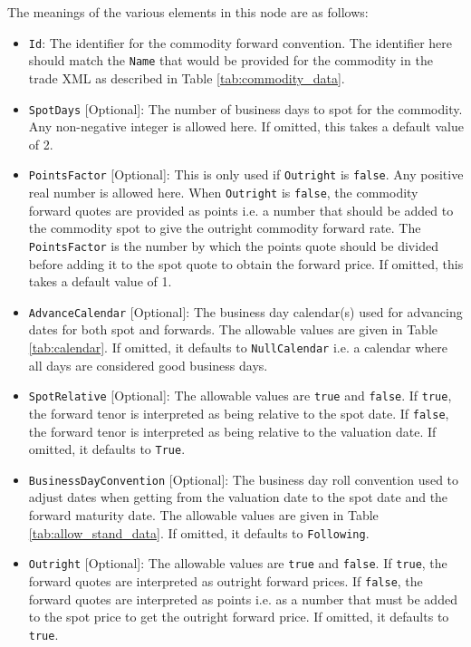 The meanings of the various elements in this node are as follows:
\begin{itemize}
\item \lstinline!Id!: The identifier for the commodity forward convention. The identifier here should match the \lstinline!Name! that would be provided for the commodity in the trade XML as described in Table \ref{tab:commodity_data}.
\item \lstinline!SpotDays! [Optional]: The number of business days to spot for the commodity. Any non-negative integer is allowed here. If omitted, this takes a default value of 2.
\item \lstinline!PointsFactor! [Optional]: This is only used if \lstinline!Outright! is \lstinline!false!. Any positive real number is allowed here. When \lstinline!Outright! is \lstinline!false!, the commodity forward quotes are provided as points i.e. a number that should be added to the commodity spot to give the outright commodity forward rate. The \lstinline!PointsFactor! is the number by which the points quote should be divided before adding it to the spot quote to obtain the forward price. If omitted, this takes a default value of 1.
\item \lstinline!AdvanceCalendar! [Optional]: The business day calendar(s) used for advancing dates for both spot and forwards. The allowable values are given in Table \ref{tab:calendar}. If omitted, it defaults to \lstinline!NullCalendar! i.e. a calendar where all days are considered good business days.
\item \lstinline!SpotRelative! [Optional]: The allowable values are \lstinline!true! and \lstinline!false!. If \lstinline!true!, the forward tenor is interpreted as being relative to the spot date. If \lstinline!false!, the forward tenor is interpreted as being relative to the valuation date. If omitted, it defaults to \lstinline!True!.
\item \lstinline!BusinessDayConvention! [Optional]: The business day roll convention used to adjust dates when getting from the valuation date to the spot date and the forward maturity date. The allowable values are given in Table \ref{tab:allow_stand_data}. If omitted, it defaults to \lstinline!Following!.
\item \lstinline!Outright! [Optional]: The allowable values are \lstinline!true! and \lstinline!false!. If \lstinline!true!, the forward quotes are interpreted as outright forward prices. If \lstinline!false!, the forward quotes are interpreted as points i.e. as a number that must be added to the spot price to get the outright forward price. If omitted, it defaults to \lstinline!true!.
\end{itemize}

